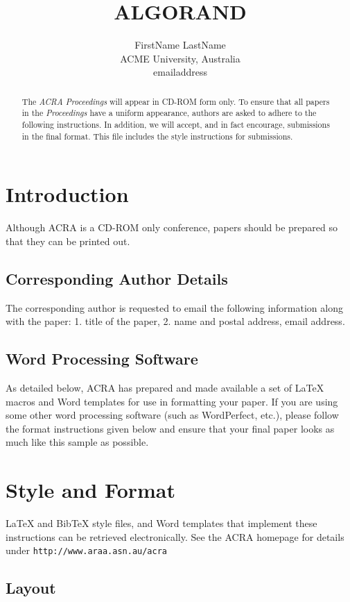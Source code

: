 \documentclass{article}
\title{ALGORAND}
\author{FirstName LastName \\ ACME University, Australia \\ 
emailaddress}
\begin{document}
\maketitle

\begin{abstract}
The {\it ACRA Proceedings} will appear in CD-ROM form only.
To ensure that all papers in the {\it Proceedings} have a
uniform appearance, authors are asked to adhere to the following
instructions. In addition, we will accept, and in fact encourage, 
submissions in the final format. This file includes the style instructions 
for submissions.
\end{abstract}

\section{Introduction}

Although ACRA is a CD-ROM only conference, papers should be prepared so that
they can be printed out. 

\subsection{Corresponding Author Details} 
The corresponding author is requested to email the following
information along with the paper: 1. title of the paper, 
2. name and postal address, email address.

\subsection{Word Processing Software}

As detailed below, ACRA has prepared and made available a set of
\LaTeX{} macros and Word templates for use in formatting your paper.
If you are using some other word processing software (such as
WordPerfect, etc.), please follow the format instructions given below
and ensure that your final paper looks as much like this sample as
possible.

\section{Style and Format}

\LaTeX{} and Bib\TeX{} style files, and Word templates that implement these 
instructions can be retrieved electronically.  See the ACRA homepage for 
details under
\verb+http://www.araa.asn.au/acra+

\subsection{Layout}
\end{document}
